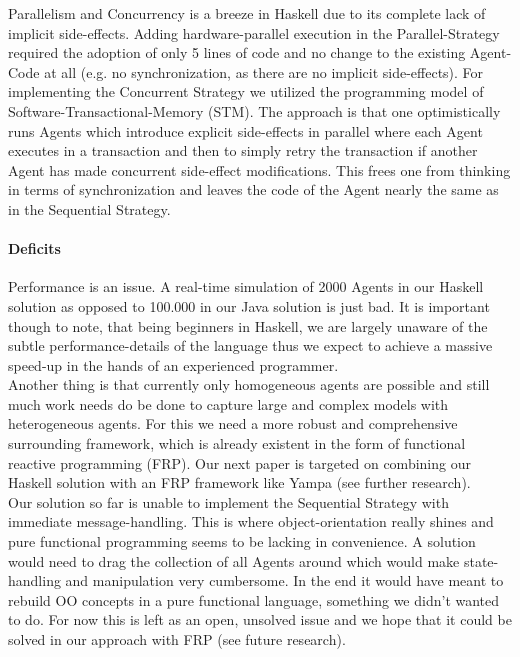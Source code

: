 Parallelism and Concurrency is a breeze in Haskell due to its complete lack of implicit side-effects. Adding hardware-parallel execution in the Parallel-Strategy required the adoption of only 5 lines of code and no change to the existing Agent-Code at all (e.g. no synchronization, as there are no implicit side-effects). For implementing the Concurrent Strategy we utilized the programming model of Software-Transactional-Memory (STM). The approach is that one optimistically runs Agents which introduce explicit side-effects in parallel where each Agent executes in a transaction and then to simply retry the transaction if another Agent has made concurrent side-effect modifications. This frees one from thinking in terms of synchronization and leaves the code of the Agent nearly the same as in the Sequential Strategy.

\paragraph{Deficits}
Performance is an issue. A real-time simulation of 2000 Agents in our Haskell solution as opposed to 100.000 in our Java solution is just bad. It is important though to note, that being beginners in Haskell, we are largely unaware of the subtle performance-details of the language thus we expect to achieve a massive speed-up in the hands of an experienced programmer. \\

Another thing is that currently only homogeneous agents are possible and still much work needs do be done to capture large and complex models with heterogeneous agents. For this we need a more robust and comprehensive surrounding framework, which is already existent in the form of functional reactive programming (FRP). Our next paper is targeted on combining our Haskell solution with an FRP framework like Yampa (see further research). \\ 

Our solution so far is unable to implement the Sequential Strategy with immediate message-handling. This is where object-orientation really shines and pure functional programming seems to be lacking in convenience. A solution would need to drag the collection of all Agents around which would make state-handling and manipulation very cumbersome. In the end it would have meant to rebuild OO concepts in a pure functional language, something we didn't wanted to do. For now this is left as an open, unsolved issue and we hope that it could be solved in our approach with FRP (see future research).

